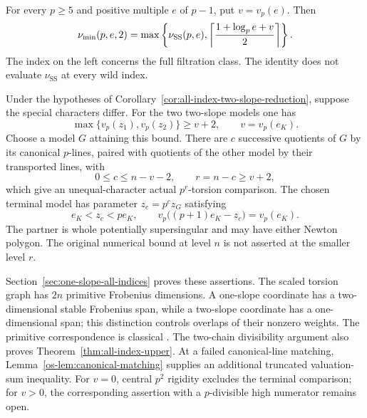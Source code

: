 \begin{theorem}\label{thm:full-supersingular-maximum}
For every $p\ge5$ and positive multiple $e$ of $p-1$, put $v=v_p(e)$. Then
\[
 \nu_{\min}(p,e,2)=\max\left\{\nu_{\mathrm{SS}}(p,e),
       \left\lceil\frac{1+\log_p e+v}{2}\right\rceil\right\}.
\]
The index on the left concerns the full filtration class. The identity does not evaluate $\nu_{\mathrm{SS}}$ at every wild index.
\end{theorem}

\begin{theorem}\label{thm:all-index-central-reduction}
Under the hypotheses of Corollary~\ref{cor:all-index-two-slope-reduction}, suppose the special characters differ. For the two two-slope models one has
\[
 \max\{v_p(z_1),v_p(z_2)\}\ge v+2,\qquad v=v_p(e_K).
\]
Choose a model $G$ attaining this bound. There are $c$ successive quotients of $G$ by its canonical $p$-lines, paired with quotients of the other model by their transported lines, with
\[
 0\le c\le n-v-2,\qquad r=n-c\ge v+2,
\]
which give an unequal-character actual $p^r$-torsion comparison. The chosen terminal model has parameter $z_c=p^c z_G$ satisfying
\[
 e_K<z_c<pe_K,\qquad
 v_p\bigl((p+1)e_K-z_c\bigr)=v_p(e_K).
\]
The partner is whole potentially supersingular and may have either Newton polygon. The original numerical bound at level $n$ is not asserted at the smaller level $r$.
\end{theorem}

Section~\ref{sec:one-slope-all-indices} proves these assertions. The scaled torsion graph has $2n$ primitive Frobenius dimensions. A one-slope coordinate has a two-dimensional stable Frobenius span, while a two-slope coordinate has a one-dimensional span; this distinction controls overlaps of their nonzero weights. The primitive correspondence is classical \citep[\S\S2.1--2.2, pp.~3--4]{Koch2015}. The two-chain divisibility argument also proves Theorem~\ref{thm:all-index-upper}. At a failed canonical-line matching, Lemma~\ref{os-lem:canonical-matching} supplies an additional truncated valuation-sum inequality. For $v=0$, central $p^2$ rigidity excludes the terminal comparison; for $v>0$, the corresponding assertion with a $p$-divisible high numerator remains open.
